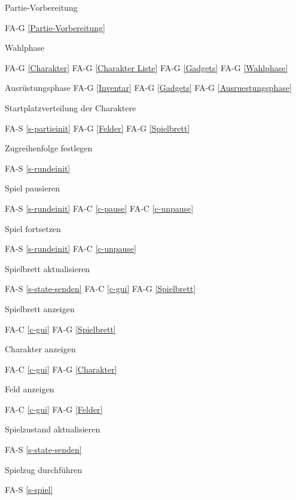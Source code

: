 Partie-Vorbereitung

FA-G \ref{Partie-Vorbereitung} %

Wahlphase

FA-G \ref{Charakter} %
FA-G \ref{Charakter Liste} %
FA-G \ref{Gadgets} %
FA-G \ref{Wahlphase} %

Ausrüstungsphase
FA-G \ref{Inventar} %
FA-G \ref{Gadgets} %
FA-G \ref{Ausruestungsphase} %

Startplatzverteilung der Charaktere

FA-S \ref{s-partieinit} %
FA-G \ref{Felder} %
FA-G \ref{Spielbrett} %

Zugreihenfolge festlegen

FA-S \ref{s-rundeinit} %

Spiel pausieren

FA-S \ref{s-rundeinit} %
FA-C \ref{c-pause} %
FA-C \ref{c-unpause} %

Spiel fortsetzen

FA-S \ref{s-rundeinit} %
FA-C \ref{c-unpause} %

Spielbrett aktualisieren

FA-S \ref{s-state-senden} %
FA-C \ref{c-gui} %
FA-G \ref{Spielbrett} %

Spielbrett anzeigen

FA-C \ref{c-gui} %
FA-G \ref{Spielbrett} %

Charakter anzeigen 

FA-C \ref{c-gui} %
FA-G \ref{Charakter} %

Feld anzeigen

FA-C \ref{c-gui} %
FA-G \ref{Felder} %

Spielzustand aktualisieren

FA-S \ref{s-state-senden} %

Spielzug durchführen

FA-S \ref{s-spiel} %

